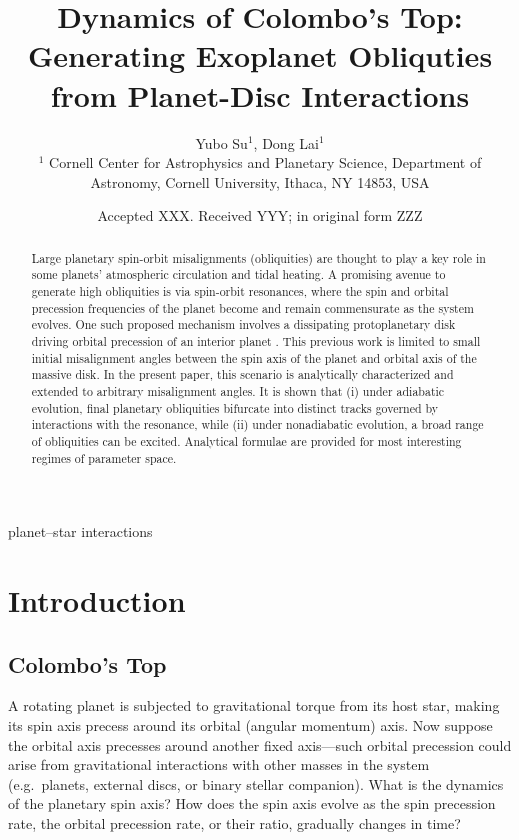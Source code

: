 \documentclass[
        fleqn,
        usenatbib,
    ]{mnras}
\title[Exoplanet Obliquities]{Dynamics of Colombo's Top: Generating Exoplanet
Obliquties from Planet-Disc Interactions}
\author[Y. Su and D. Lai]{
Yubo Su$^1$,
Dong Lai$^1$
\\
$^1$ Cornell Center for Astrophysics and Planetary Science, Department of
Astronomy, Cornell University, Ithaca, NY 14853, USA
}
\date{Accepted XXX\@. Received YYY\@; in original form ZZZ}
\begin{document}
\label{firstpage}
\pagerange{\pageref{firstpage}--\pageref{lastpage}}
\maketitle

\begin{abstract}
    Large planetary spin-orbit misalignments (obliquities) are thought to play a
    key role in some planets' atmospheric circulation and tidal heating. A
    promising avenue to generate high obliquities is via spin-orbit resonances,
    where the spin and orbital precession frequencies of the planet become and
    remain commensurate as the system evolves. One such proposed mechanism
    involves a dissipating protoplanetary disk driving orbital precession of an
    interior planet \citep{millholland_disk}. This previous work is limited to
    small initial misalignment angles between the spin axis of the planet and
    orbital axis of the massive disk. In the present paper, this scenario is
    analytically characterized and extended to arbitrary misalignment angles. It
    is shown that (i) under adiabatic evolution, final planetary obliquities
    bifurcate into distinct tracks governed by interactions with the resonance,
    while (ii) under nonadiabatic evolution, a broad range of obliquities can
    be excited. Analytical formulae are provided for most interesting regimes of
    parameter space.
\end{abstract}

\begin{keywords}
planet--star interactions %
\end{keywords}

\section{Introduction}\label{s:intro}

\subsection{Colombo's Top}

A rotating planet is subjected to gravitational torque from its host star,
making its spin axis precess around its orbital (angular momentum) axis.  Now
suppose the orbital axis precesses around another fixed axis---such orbital
precession could arise from gravitational interactions with other masses in the
system (e.g.\ planets, external discs, or binary stellar companion). What is the
dynamics of the planetary spin axis?  How does the spin axis evolve as the spin
precession rate, the orbital precession rate, or their ratio, gradually changes
in time?
\end{document}
